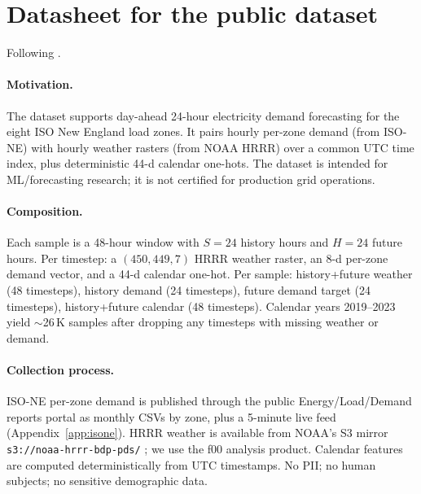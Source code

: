 
\section{Datasheet for the public dataset}
\label{app:datasheet}

Following \citet{gebru2018datasheets}.

\paragraph{Motivation.} The dataset supports day-ahead 24-hour electricity demand forecasting for the eight ISO New England load zones. It pairs hourly per-zone demand (from ISO-NE) with hourly weather rasters (from NOAA HRRR) over a common UTC time index, plus deterministic 44-d calendar one-hots. The dataset is intended for ML/forecasting research; it is not certified for production grid operations.

\paragraph{Composition.} Each sample is a 48-hour window with $S=24$ history hours and $H=24$ future hours. Per timestep: a $(450, 449, 7)$ HRRR weather raster, an 8-d per-zone demand vector, and a 44-d calendar one-hot. Per sample: history+future weather (48 timesteps), history demand (24 timesteps), future demand target (24 timesteps), history+future calendar (48 timesteps). Calendar years 2019--2023 yield $\sim$26\,K samples after dropping any timesteps with missing weather or demand.

\paragraph{Collection process.} ISO-NE per-zone demand is published through the public Energy/Load/Demand reports portal \citep{isone2024data} as monthly CSVs by zone, plus a 5-minute live feed (Appendix~\ref{app:isone}). HRRR weather is available from NOAA's S3 mirror \texttt{s3://noaa-hrrr-bdp-pds/} \citep{noaa2024hrrr,benjamin2016hrrr}; we use the f00 analysis product. Calendar features are computed deterministically from UTC timestamps. No PII; no human subjects; no sensitive demographic data.

